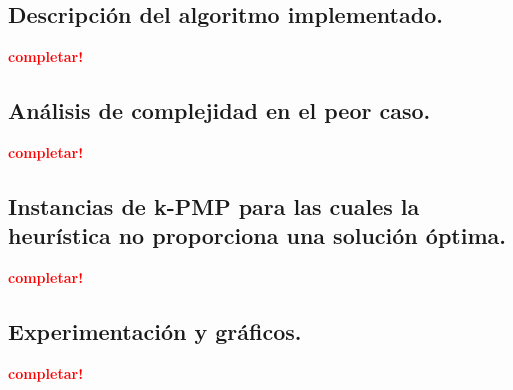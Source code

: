 \subsection{Descripción del algoritmo implementado.}
\vspace*{0.3cm}
\textcolor{red}{\textbf{completar!}}



\newpage
\subsection{Análisis de complejidad en el peor caso.}
\vspace*{0.3cm}
\textcolor{red}{\textbf{completar!}}



\newpage
\subsection{Instancias de k-PMP para las cuales la heurística no proporciona
            una solución óptima.}
\vspace*{0.3cm}
\textcolor{red}{\textbf{completar!}}



\newpage
\subsection{Experimentación y gráficos.}
\vspace*{0.3cm}
\textcolor{red}{\textbf{completar!}}
